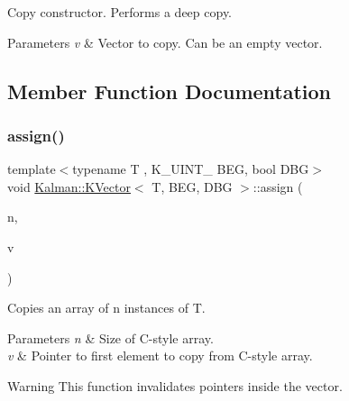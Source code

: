 Copy constructor. Performs a deep copy. 


\begin{DoxyParams}{Parameters}
{\em v} & Vector to copy. Can be an empty vector. \\
\hline
\end{DoxyParams}


\subsection{Member Function Documentation}
\mbox{\label{classKalman_1_1KVector_ae2adbc92a6c8af12f05135cbca65b31a}} 
\subsubsection{\texorpdfstring{assign()}{assign()}}
{\footnotesize\ttfamily template$<$typename T , K\+\_\+\+U\+I\+N\+T\+\_ B\+EG, bool D\+BG$>$ \\
void \mbox{\hyperlink{classKalman_1_1KVector}{Kalman\+::\+K\+Vector}}$<$ T, B\+EG, D\+BG $>$\+::assign (\begin{DoxyParamCaption}\item[{\mbox{\hyperlink{namespaceKalman_a628a50cae10f6e2035393d4f96c698bd}{K\+\_\+\+U\+I\+N\+T\+\_\+32}}}]{n,  }\item[{const T $\ast$}]{v }\end{DoxyParamCaption})\hspace{0.3cm}{\ttfamily [inline]}}



Copies an array of {\ttfamily n} instances of {\ttfamily T}. 


\begin{DoxyParams}{Parameters}
{\em n} & Size of C-\/style array. \\
\hline
{\em v} & Pointer to first element to copy from C-\/style array. \\
\hline
\end{DoxyParams}
\begin{DoxyWarning}{Warning}
This function invalidates pointers inside the vector. 
\end{DoxyWarning}
\mbox{\label{classKalman_1_1KVector_ad0ded1cdecfc9c58d5f42ae97b19ebbd}} 
